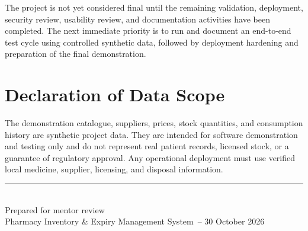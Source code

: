 \documentclass[12pt,a4paper]{article}
\newcommand{\projecttitle}{Pharmacy Inventory \& Expiry Management System}
\begin{document}
The project is not yet considered final until the remaining validation,
deployment, security review, usability review, and documentation activities have
been completed. The next immediate priority is to run and document an
end-to-end test cycle using controlled synthetic data, followed by deployment
hardening and preparation of the final demonstration.

\section*{Declaration of Data Scope}
The demonstration catalogue, suppliers, prices, stock quantities, and
consumption history are synthetic project data. They are intended for software
demonstration and testing only and do not represent real patient records,
licensed stock, or a guarantee of regulatory approval. Any operational
deployment must use verified local medicine, supplier, licensing, and disposal
information.

\vfill
\begin{center}
\rule{0.8\textwidth}{0.4pt}\\[0.2cm]
\small Prepared for mentor review\\
\small \projecttitle\ -- 30 October 2026
\end{center}
\end{document}
